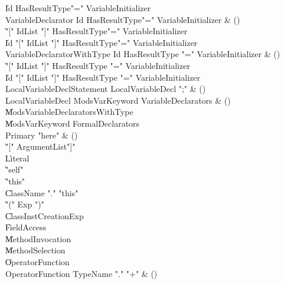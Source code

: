 \begin{bbgrammar}

    \| Id HasResultType\opt \xcd"=" VariableInitializer\\
 VariableDeclarator  \label{prod:VariableDeclarator}  \: Id HasResultType\opt \xcd"=" VariableInitializer & ()\\
    \| \xcd"[" IdList \xcd"]" HasResultType\opt \xcd"=" VariableInitializer\\
    \| Id \xcd"[" IdList \xcd"]" HasResultType\opt \xcd"=" VariableInitializer\\
 VariableDeclaratorWithType  \label{prod:VariableDeclaratorWithType}  \: Id HasResultType \xcd"=" VariableInitializer & ()\\
    \| \xcd"[" IdList \xcd"]" HasResultType \xcd"=" VariableInitializer\\
    \| Id \xcd"[" IdList \xcd"]" HasResultType \xcd"=" VariableInitializer\\
 LocalVariableDeclStatement  \label{prod:LocalVariableDeclStatement}  \: LocalVariableDecl \xcd";" & ()\\
 LocalVariableDecl  \label{prod:LocalVariableDecl}  \: Mods\opt VarKeyword VariableDeclarators & ()\\
    \| Mods\opt VariableDeclaratorsWithType\\
    \| Mods\opt VarKeyword FormalDeclarators\\
 Primary  \label{prod:Primary}  \: \xcd"here" & ()\\
    \| \xcd"[" ArgumentList\opt \xcd"]"\\
    \| Literal\\
    \| \xcd"self"\\
    \| \xcd"this"\\
    \| ClassName \xcd"." \xcd"this"\\
    \| \xcd"(" Exp \xcd")"\\
    \| ClassInstCreationExp\\
    \| FieldAccess\\
    \| MethodInvocation\\
    \| MethodSelection\\
    \| OperatorFunction\\
 OperatorFunction  \label{prod:OperatorFunction}  \: TypeName \xcd"." \xcd"+" & ()\\

\end{bbgrammar}
